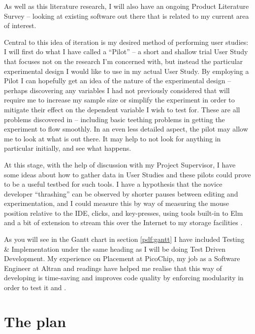 As well as this literature
research, I will also have an ongoing Product Literature Survey -- looking at
existing software out there that is related to my current area of interest.

Central to this idea of iteration
is my desired method of performing user studies: I will first do what I have called a
``Pilot'' -- a short and shallow trial User Study that focuses not on the
research I'm concerned with, but instead the particular experimental design I
would like to use in my actual User Study. By employing a Pilot I can hopefully
get an idea of the nature of the experimental design -- perhaps discovering any
variables I had not previously considered that will require me to increase my
sample size or simplify the experiment in order to mitigate their effect on the
dependent variable I wish to test for. These are all problems discovered in
\cite{Yates2012a} -- including basic teething problems in
getting the experiment to flow smoothly. In an even less detailed aspect, the
pilot may allow me to look at what is out there. It may help to not look
for anything in particular initially, and see what happens. 

At this stage, with
the help of discussion with my Project Supervisor, I have some ideas about how
to gather data in User Studies and these pilots could prove to be a useful
testbed for such tools. I have a hypothesis that the novice developer
``thrashing'' \cite{Lopez2012a} can be observed by shorter pauses between editing and
experimentation, and I could measure this by way of measuring the mouse position
relative to the IDE, clicks, and key-presses, using tools built-in to Elm and a
bit of extension to stream this over the Internet to my storage facilities
\cite{WhatFRP}.


As you will see in the Gantt chart in section
\ref{pdf:gantt} I have included Testing \& Implementation under the same heading
as I will be doing Test Driven Development. My experience on Placement at
PicoChip, my job as a Software Engineer at Altran and readings have helped me realise that this way of
developing is time-saving and improves code quality by enforcing modularity in
order to test it \cite{Martin2008a} and \cite{Hunt2000a}.


\section{The plan} 



